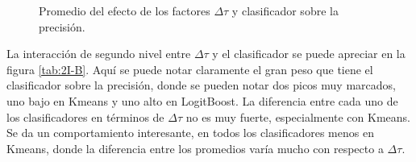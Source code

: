 \begin{figure}[H]
    \centering
\caption{Promedio del efecto de los factores $\Delta \tau$ y clasificador sobre la precisión.}
\label{tab:ME-B}
\end{figure}


La interacción de segundo nivel entre $\Delta \tau$ y el clasificador se puede apreciar en la figura \ref{tab:2I-B}. 
Aquí se puede notar claramente el gran peso que tiene el clasificador sobre la precisión, donde se pueden notar dos picos muy marcados, uno bajo en Kmeans y uno alto en LogitBoost. 
La diferencia entre cada uno de los clasificadores en términos de $\Delta \tau$ no es muy fuerte, especialmente con Kmeans. Se da un comportamiento interesante, en todos los clasificadores menos en Kmeans, donde la diferencia entre los promedios varía mucho con respecto a $\Delta \tau$.

